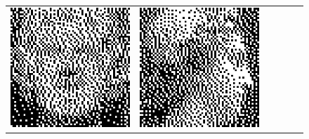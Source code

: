\begin{figure}
\begin{tabular}{c c c c c c}
		\includegraphics[width=\tilewidth,interpolate=false]{media/chp2/associative_memory/binam/06_02_out_scaled_crushed.png}&%
		\includegraphics[width=\tilewidth,interpolate=false]{media/chp2/associative_memory/binam/07_00_orig_scaled_crushed.png}&%

\end{tabular}
\end{figure}
